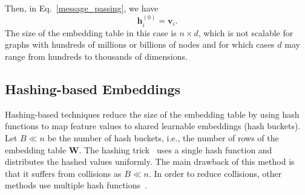 \documentclass[conference]{IEEEtran}
\begin{document}
Then, in Eq.~\ref{message_passing}, we have
\begin{equation}
    \mathbf{h}_i^{(0)}=\mathbf{v}_i.
\end{equation}
% 
The size of the embedding table in this case is $n\times d$, which is not scalable for graphs with hundreds of millions or billions of nodes and for which cases $d$ may range from hundreds to thousands of dimensions. 


\subsection{Hashing-based Embeddings}
Hashing-based techniques reduce the size of the embedding table by using hash functions to map feature values to shared learnable embeddings (hash buckets). 
Let $B \ll n$ be the number of hash buckets, i.e., the number of rows of the embedding table $\mathbf{W}$. 
The hashing trick~\cite{weinberger2009feature} uses a single hash function and distributes the hashed values uniformly. The main drawback of this method is that it suffers from collisions as $B\ll n$. In order to reduce collisions, other methods use multiple hash functions~\cite{serra2017getting, svenstrup2017hash, zhang2020model}.
\end{document}
